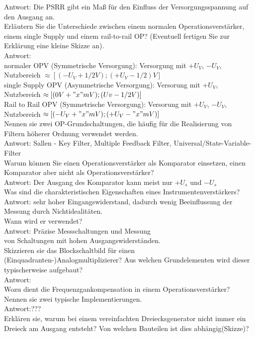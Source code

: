 \documentclass[A4]{scrartcl}
\begin{document}
  \bigskip Antwort: Die PSRR gibt ein Maß für den Einfluss der Versorgungsspannung auf den Ausgang an.\\
  Erläutern Sie die Unterschiede zwischen einem normalen Operationsverstärker, einem single Supply und einem rail-to-rail OP? (Eventuell fertigen Sie zur Erklärung eine kleine Skizze an).\\
  Antwort: \\
  normaler OPV (Symmetrische Versorgung): Versorgung mit $+U_V$, $-U_V$, Nutzbereich $\approx [(-U_V +1/2V); (+U_V -1/2)V]$\\
  single Supply OPV (Asymmetrische Versorgung): Versorung mit $+U_V$, Nutzbereich $\approx [(0V+ "x"mV); (Uv -1/2V)]$ \\
  \bigskip Rail to Rail OPV (Symmetrische Versorgung): Versorung mit $+U_V$, $-U_V$, Nutzbereich $\approx [(-U_V + "x"mV); (+U_V - "x"mV)]$\\
  Nennen sie zwei OP-Grundschaltungen, die häufig für die Realisierung von Filtern höherer Ordnung verwendet werden.\\
  \bigskip 
  Antwort: Sallen - Key Filter, Multiple Feedback Filter, Universal/State-Variable-Filter\\
  Warum können Sie einen Operationsverstärker als Komparator einsetzen, einen Komparator aber nicht als Operationsverstärker?\\
  \bigskip 
  Antwort: Der Ausgang des Komparator kann meist nur $+U_s$ und $-U_s$\\
  \newpage
  Was sind die charakteristischen Eigenschaften eines Instrumentenverstärkers?\\
  Antwort: sehr hoher Eingangswiderstand, dadurch wenig Beeinflussung der Messung durch Nichtidealitäten.\\
  Wann wird er verwendet?\\
  \bigskip 
  Antwort: Präzise Messschaltungen und Messung\\ von Schaltungen mit hohen Ausgangswiderständen.\\
  Skizzieren sie das Blockschaltbild für einen (Einquadranten-)Analogmultiplizierer? Aus welchen Grundelementen wird dieser typischerweise aufgebaut?\\
  \bigskip 
  Antwort:\\
  Wozu dient die Frequenzgankompensation in einem Operationsverstärker? Nennen sie zwei typische Implementierungen.\\
  \bigskip Antwort:??? \\ 
  Erklären sie, warum bei einem vereinfachten Dreiecksgenerator nicht immer ein Dreieck am Ausgang entsteht? Von welchen Bauteilen ist dies abhängig(Skizze)?\\
\end{document}
